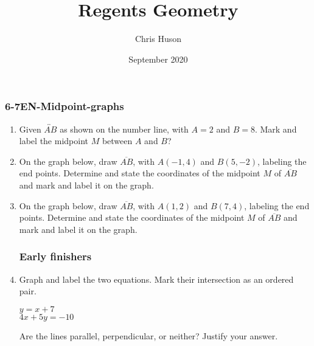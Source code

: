 \documentclass[12pt, twoside]{article}
\title{Regents Geometry}
\author{Chris Huson}
\date{September 2020}
\begin{document}
\subsubsection*{6-7EN-Midpoint-graphs}
\begin{enumerate}
\item Given $\overleftrightarrow{AB}$ as shown on the number line, with $A=2$ and $B=8$. Mark and label the midpoint $M$ between $A$ and $B$?\\[20pt] %
  
\item On the graph below, draw $\overline{AB}$, with $A(-1,4)$ and $B(5,-2)$, labeling the end points. Determine and state the coordinates of the midpoint $M$ of $\overline{AB}$ and mark and label it on the graph.
  \begin{flushright}
  \end{flushright}
  
  
\item On the graph below, draw $\overline{AB}$, with $A(1,2)$ and $B(7,4)$, labeling the end points. Determine and state the coordinates of the midpoint $M$ of $\overline{AB}$ and mark and label it on the graph.
  \begin{flushright}
  \end{flushright}
  \vspace{1cm}

\newpage
\subsubsection*{Early finishers}
\item Graph and label the two equations. Mark their intersection as an ordered pair.
\begin{multicols}{2}
  $y = x+7$ \\
  $4x+5y=-10$
\end{multicols}     \vspace{2cm}
Are the lines parallel, perpendicular, or neither? Justify your answer.
\vspace{2cm}


\end{enumerate}
\end{document}

